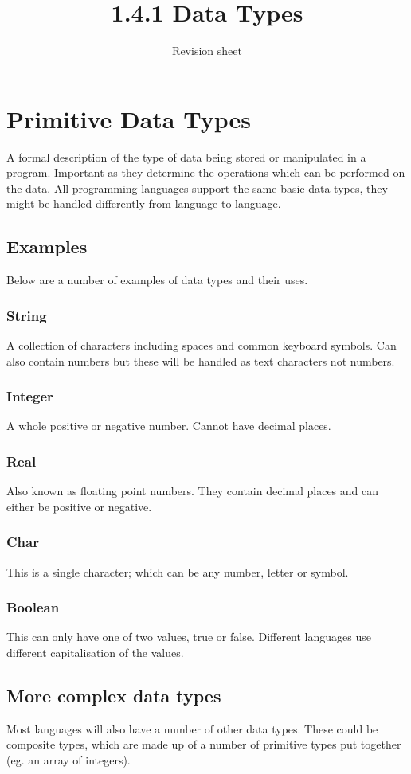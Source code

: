 \documentclass[a4paper,11pt, twocolumn]{article}
\title{1.4.1 Data Types}
\author{Revision sheet}
\date{}
\begin{document}
\maketitle
\thispagestyle{fancy}

\section{Primitive Data Types}
A formal description of the type of data being stored or manipulated in a program. Important as they determine the operations which can be performed on the data. All programming languages support the same basic data types, they might be handled differently from language to language.
\subsection{Examples}
Below are a number of examples of data types and their uses.
\subsubsection{String}
A collection of characters including spaces and common keyboard symbols. Can also contain numbers but these will be handled as text characters not numbers.
\subsubsection{Integer}
A whole positive or negative number. Cannot have decimal places.
\subsubsection{Real}
Also known as floating point numbers. They contain decimal places and can either be positive or negative.
\subsubsection{Char}
This is a single character; which can be any number, letter or symbol. 
\subsubsection{Boolean}
This can only have one of two values, true or false. Different languages use different capitalisation of the values.
\subsection{More complex data types}
Most languages will also have a number of other data types. These could be composite types, which are made up of a number of primitive types put together (eg. an array of integers).
\end{document}
